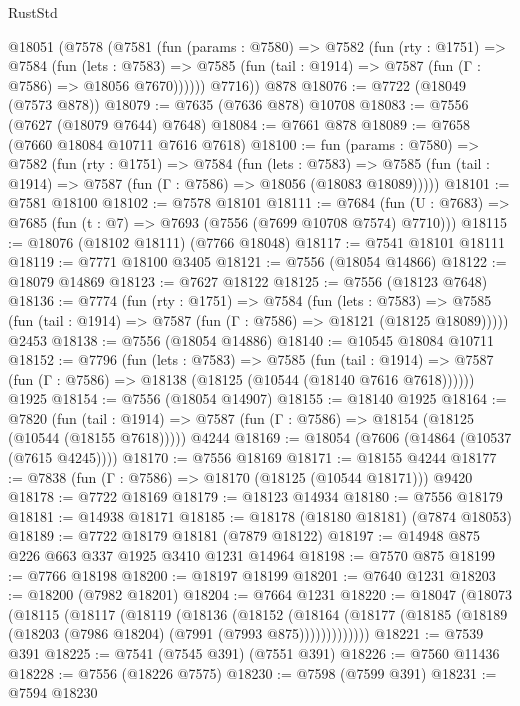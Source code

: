 \begin{lexlean}{RustStd}
\begin{coremodule}
{\begin{coremodule}
{{{{{{{{{{{{{{{{{{{{{{{{{{{{{{{{{{{{{{{{{{{    @18051
      (@7578
        (@7581
          (fun (params : @7580) =>
          @7582
            (fun (rty : @1751) =>
            @7584
              (fun (lets : @7583) =>
              @7585 (fun (tail : @1914) => @7587 (fun (Γ : @7586) => @18056 @7670))))))
        @7716))
    @878
@18076 := @7722 (@18049 (@7573 @878))
@18079 := @7635 (@7636 @878) @10708
@18083 := @7556 (@7627 (@18079 @7644) @7648)
@18084 := @7661 @878
@18089 := @7658 (@7660 @18084 @10711 @7616 @7618)
@18100 := fun (params : @7580) =>
  @7582
    (fun (rty : @1751) =>
    @7584
      (fun (lets : @7583) =>
      @7585 (fun (tail : @1914) => @7587 (fun (Γ : @7586) => @18056 (@18083 @18089)))))
@18101 := @7581 @18100
@18102 := @7578 @18101
@18111 := @7684
    (fun (U : @7683) => @7685 (fun (t : @7) => @7693 (@7556 (@7699 @10708 @7574) @7710)))
@18115 := @18076 (@18102 @18111) (@7766 @18048)
@18117 := @7541 @18101 @18111
@18119 := @7771 @18100 @3405
@18121 := @7556 (@18054 @14866)
@18122 := @18079 @14869
@18123 := @7627 @18122
@18125 := @7556 (@18123 @7648)
@18136 := @7774
    (fun (rty : @1751) =>
    @7584
      (fun (lets : @7583) =>
      @7585 (fun (tail : @1914) => @7587 (fun (Γ : @7586) => @18121 (@18125 @18089)))))
    @2453
@18138 := @7556 (@18054 @14886)
@18140 := @10545 @18084 @10711
@18152 := @7796
    (fun (lets : @7583) =>
    @7585
      (fun (tail : @1914) =>
      @7587 (fun (Γ : @7586) => @18138 (@18125 (@10544 (@18140 @7616 @7618))))))
    @1925
@18154 := @7556 (@18054 @14907)
@18155 := @18140 @1925
@18164 := @7820
    (fun (tail : @1914) => @7587 (fun (Γ : @7586) => @18154 (@18125 (@10544 (@18155 @7618)))))
    @4244
@18169 := @18054 (@7606 (@14864 (@10537 (@7615 @4245))))
@18170 := @7556 @18169
@18171 := @18155 @4244
@18177 := @7838 (fun (Γ : @7586) => @18170 (@18125 (@10544 @18171))) @9420
@18178 := @7722 @18169
@18179 := @18123 @14934
@18180 := @7556 @18179
@18181 := @14938 @18171
@18185 := @18178 (@18180 @18181) (@7874 @18053)
@18189 := @7722 @18179 @18181 (@7879 @18122)
@18197 := @14948 @875 @226 @663 @337 @1925 @3410 @1231 @14964
@18198 := @7570 @875
@18199 := @7766 @18198
@18200 := @18197 @18199
@18201 := @7640 @1231
@18203 := @18200 (@7982 @18201)
@18204 := @7664 @1231
@18220 := @18047
    (@18073
      (@18115
        (@18117
          (@18119
            (@18136
              (@18152
                (@18164
                  (@18177 (@18185 (@18189 (@18203 (@7986 @18204) (@7991 (@7993 @875)))))))))))))
@18221 := @7539 @391
@18225 := @7541 (@7545 @391) (@7551 @391)
@18226 := @7560 @11436
@18228 := @7556 (@18226 @7575)
@18230 := @7598 (@7599 @391)
@18231 := @7594 @18230
}}}}}}}}}}}}}}}}}}}}}}}}}}}}}}}}}}}}}}}}}}}
\end{coremodule}}
\end{coremodule}
\end{lexlean}
